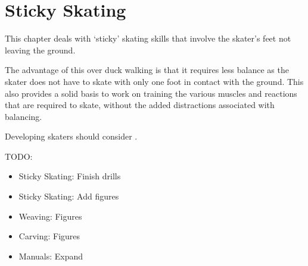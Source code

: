 \chapter{Sticky Skating}
\label{ch:sticky}


This chapter deals with `sticky' skating skills that involve the skater's feet not leaving the ground.


The advantage of this over duck walking is that it requires less balance as the skater does not have to skate with only one foot in contact with the ground.    
This also provides a solid basis to work on training the various muscles and reactions that are required to skate, without the added distractions associated with balancing.  


Developing skaters should consider .   

{\color{red} TODO:
\begin{itemize}
\item Sticky Skating: Finish drills
\item Sticky Skating: Add figures 
\item Weaving: Figures 
\item Carving: Figures 
\item Manuals: Expand
\end{itemize}
}
